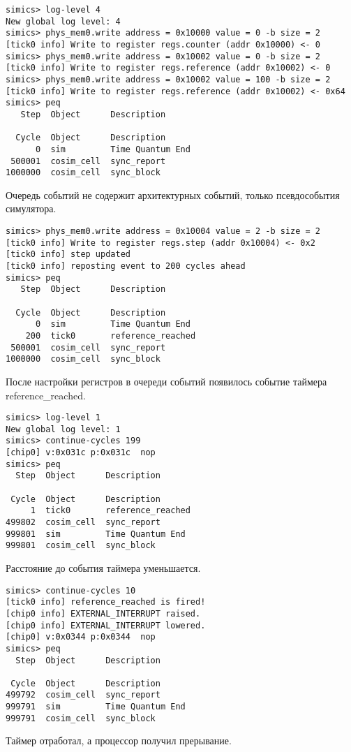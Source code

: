 \begin{lstlisting}
simics> log-level 4
New global log level: 4
simics> phys_mem0.write address = 0x10000 value = 0 -b size = 2
[tick0 info] Write to register regs.counter (addr 0x10000) <- 0
simics> phys_mem0.write address = 0x10002 value = 0 -b size = 2
[tick0 info] Write to register regs.reference (addr 0x10002) <- 0
simics> phys_mem0.write address = 0x10002 value = 100 -b size = 2
[tick0 info] Write to register regs.reference (addr 0x10002) <- 0x64
simics> peq
   Step  Object      Description

  Cycle  Object      Description
      0  sim         Time Quantum End
 500001  cosim_cell  sync_report
1000000  cosim_cell  sync_block
\end{lstlisting}
Очередь событий не содержит архитектурных событий, только псевдособытия симулятора.

\begin{lstlisting}
simics> phys_mem0.write address = 0x10004 value = 2 -b size = 2
[tick0 info] Write to register regs.step (addr 0x10004) <- 0x2
[tick0 info] step updated
[tick0 info] reposting event to 200 cycles ahead
simics> peq
   Step  Object      Description

  Cycle  Object      Description
      0  sim         Time Quantum End
    200  tick0       reference_reached
 500001  cosim_cell  sync_report
1000000  cosim_cell  sync_block
\end{lstlisting}
После настройки регистров в очереди событий появилось событие таймера  reference_reached.

\begin{lstlisting}
simics> log-level 1
New global log level: 1
simics> continue-cycles 199
[chip0] v:0x031c p:0x031c  nop
simics> peq
  Step  Object      Description

 Cycle  Object      Description
     1  tick0       reference_reached
499802  cosim_cell  sync_report
999801  sim         Time Quantum End
999801  cosim_cell  sync_block
\end{lstlisting}
Расстояние до события таймера уменьшается.

\begin{lstlisting}
simics> continue-cycles 10
[tick0 info] reference_reached is fired!
[chip0 info] EXTERNAL_INTERRUPT raised.
[chip0 info] EXTERNAL_INTERRUPT lowered.
[chip0] v:0x0344 p:0x0344  nop
simics> peq
  Step  Object      Description

 Cycle  Object      Description
499792  cosim_cell  sync_report
999791  sim         Time Quantum End
999791  cosim_cell  sync_block

\end{lstlisting}
Таймер отработал, а процессор получил прерывание.


